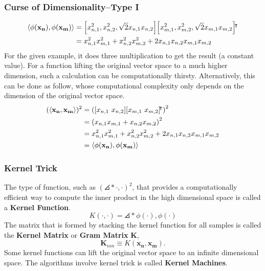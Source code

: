 \documentclass[10pt]{../formats/RU}
\begin{document}
\begin{frame}
\frametitle{Curse of Dimensionality--Type I}
  \begin{align*}
    \angles*{\phi(\mathbf{x_n}), \phi(\mathbf{x_m})}
    &= \bracks*{x_{n,1}^2 , x_{n,2}^2 , \sqrt{2}x_{n,1}x_{n,2}}\bracks*{x_{m,1}^2 , x_{m,2}^2 , \sqrt{2}x_{m,1}x_{m,2}}\trn \\
    &= x_{n,1}^2x_{m,1}^2 + x_{n,2}^2x_{m,2}^2 + 2x_{n,1}x_{n,2}x_{m,1}x_{m,2}
  \end{align*}
For the given example, it does three multiplication to get the result (a constant value). For a function lifting the original vector space to a much higher dimension, such a calculation can be computationally thirsty. Alternatively, this can be done as follow, whose computational complexity only depends on the dimension of the original vector space.
  \begin{align*}
    (\angles*{\mathbf{x_n}, \mathbf{x_m}})^2
    &= \parens*{\bracks*{x_{n,1} \ x_{n,2}}\bracks*{x_{m,1} \ x_{m,2}}\trn}^2 \\
    &= \parens*{x_{n,1}x_{m,1} + x_{n,2}x_{m,2}}^2 \\
    &= x_{n,1}^2x_{m,1}^2 + x_{n,2}^2x_{m,2}^2 + 2x_{n,1}x_{n,2}x_{m,1}x_{m,2} \\
    &= \angles*{\phi(\mathbf{x_n}), \phi(\mathbf{x_m})}
  \end{align*}
\end{frame}
\begin{frame}
  \frametitle{Kernel Trick}
  The type of function, such as $(\angles*{\cdot, \cdot})^2$, that provides a computationally efficient way to compute the inner product in the high dimensional space is called a \textbf{Kernel Function}.
  \[
    K(\cdot,\cdot) = \angles*{\phi(\cdot),\phi(\cdot)}
  \]
  The matrix that is formed by stacking the kernel function for all samples is called the \textbf{Kernel Matrix} or \textbf{Gram Matrix} $\mathbf{K}$,
  \[
    \mathbf{K}_{nm} \equiv K(\mathbf{x_n}, \mathbf{x_m}).
  \]
  Some kernel functions can lift the original vector space to an infinite dimensional space.
  The algorithms involve kernel trick is called \textbf{Kernel Machines}.
\end{frame}
\end{document}
